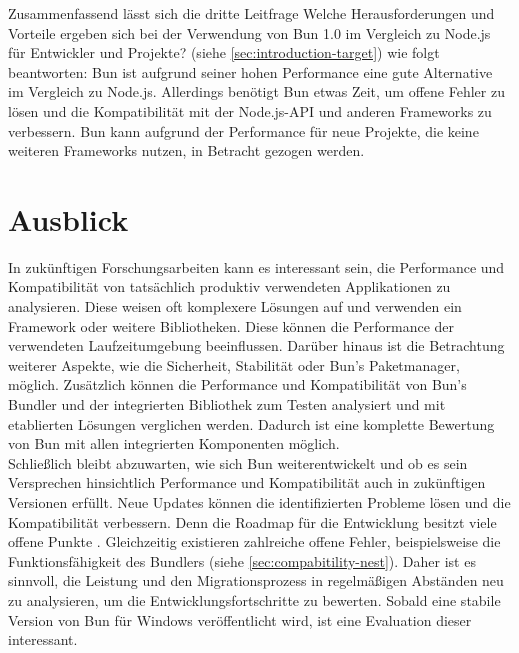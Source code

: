 \noindent
Zusammenfassend lässt sich die dritte Leitfrage \glqq Welche Herausforderungen und Vorteile ergeben sich bei der Verwendung von Bun 1.0 im Vergleich zu Node.js für Entwickler und Projekte?\grqq{} (siehe \autoref{sec:introduction-target}) wie folgt beantworten: Bun ist aufgrund seiner hohen Performance eine gute Alternative im Vergleich zu Node.js. Allerdings benötigt Bun etwas Zeit, um offene Fehler zu lösen und die Kompatibilität mit der Node.js-API und anderen Frameworks zu verbessern. Bun kann aufgrund der Performance für neue Projekte, die keine weiteren Frameworks nutzen, in Betracht gezogen werden.


\section{Ausblick} \label{sec:finalThoughts-outlook}
In zukünftigen Forschungsarbeiten kann es interessant sein, die Performance und Kompatibilität von tatsächlich produktiv verwendeten Applikationen zu analysieren. Diese weisen oft komplexere Lösungen auf und verwenden ein Framework oder weitere Bibliotheken. Diese können die Performance der verwendeten Laufzeitumgebung beeinflussen. Darüber hinaus ist die Betrachtung weiterer Aspekte, wie die Sicherheit, Stabilität oder Bun's Paketmanager, möglich. Zusätzlich können die Performance und Kompatibilität von Bun's Bundler und der integrierten Bibliothek zum Testen analysiert und mit etablierten Lösungen verglichen werden. Dadurch ist eine komplette Bewertung von Bun mit allen integrierten Komponenten möglich.\\

\noindent
Schließlich bleibt abzuwarten, wie sich Bun weiterentwickelt und ob es sein Versprechen hinsichtlich Performance und Kompatibilität auch in zukünftigen Versionen erfüllt. Neue Updates können die identifizierten Probleme lösen und die Kompatibilität verbessern. Denn die Roadmap für die Entwicklung besitzt viele offene Punkte \cite{Sumner.2022}. Gleichzeitig existieren zahlreiche offene Fehler, beispielsweise die Funktionsfähigkeit des Bundlers (siehe \autoref{sec:compabitility-nest}). Daher ist es sinnvoll, die Leistung und den Migrationsprozess in regelmäßigen Abständen neu zu analysieren, um die Entwicklungsfortschritte zu bewerten. Sobald eine stabile Version von Bun für Windows veröffentlicht wird, ist eine Evaluation dieser interessant.
